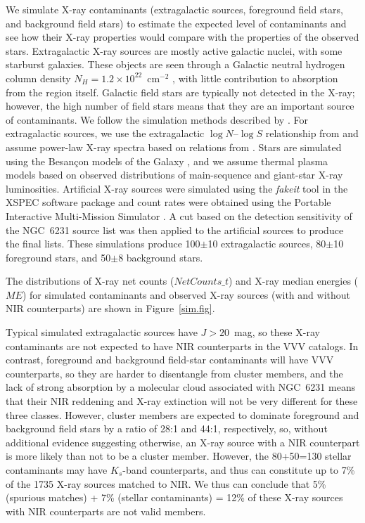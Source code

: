 \documentclass[twocolumn,tighten]{aastex61}
\newcounter{column_number}
\begin{document}
We simulate X-ray contaminants (extragalactic sources, foreground field stars, and background field stars) to estimate the expected level of contaminants and see how their X-ray properties would compare with the properties of the observed stars. Extragalactic X-ray sources are mostly active galactic nuclei, with some starburst galaxies. These objects are seen through a Galactic neutral hydrogen column density $N_H=1.2\times10^{22}$~cm$^{-2}$ \citep{1990ARA&A..28..215D}, with little contribution to absorption from the region itself. Galactic field stars are typically not detected in the X-ray; however, the high number of field stars means that they are an important source of contaminants. 
We follow the simulation methods described by \citet{2011ApJS..194....3G}. For extragalactic sources, we use the extragalactic $\log N$--$\log S$ relationship from \citet{2003ApJ...588..696M} and assume power-law X-ray spectra based on relations from \citet{2001AJ....122.2810B}. Stars are simulated using the Besan\c{c}on models of the Galaxy \citep{2003A&A...409..523R}, and we assume thermal plasma models based on observed distributions of main-sequence and giant-star X-ray luminosities.  Artificial X-ray sources were simulated using the {\it fakeit} tool in the XSPEC software package \citep{1996ASPC..101...17A} and count rates were obtained using the Portable Interactive Multi-Mission Simulator \citep[PIMMS;][]{1993Legac...3...21M}. A cut based on the detection sensitivity of the NGC~6231 source list was then applied to the artificial sources to produce the final lists. These simulations produce 100$\pm$10 extragalactic sources, 80$\pm$10 foreground stars, and 50$\pm$8 background stars. 

The distributions of X-ray net counts ($NetCounts\_t$) and X-ray median energies ($ME$) for simulated contaminants and observed X-ray sources (with and without NIR counterparts) are shown in Figure~\ref{sim.fig}. 

Typical simulated extragalactic sources have $J>20$~mag, so these X-ray contaminants are not expected to have NIR counterparts in the VVV catalogs. In contrast, foreground and background field-star contaminants will have VVV counterparts, so they are harder to disentangle from cluster members, and the lack of strong absorption by a molecular cloud associated with NGC~6231 means that their NIR reddening and X-ray extinction will not be very different for these three classes. However, cluster members are expected to dominate foreground and background field stars by a ratio of 28:1 and 44:1, respectively, so, without additional evidence suggesting otherwise, an X-ray source with a NIR counterpart is more likely than not to be a cluster member. However, the 80+50=130 stellar contaminants may have $K_s$-band counterparts, and thus can constitute up to 7\% of the 1735 X-ray sources matched to NIR. We thus can conclude that 5\% (spurious matches) + 7\% (stellar contaminants) = 12\% of these X-ray sources with NIR counterparts are not valid members.  
\end{document}

